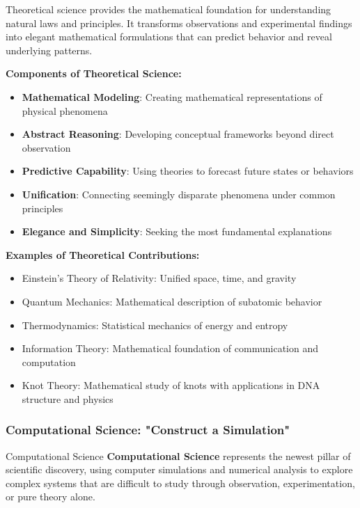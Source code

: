 Theoretical science provides the mathematical foundation for understanding natural laws and principles. It transforms observations and experimental findings into elegant mathematical formulations that can predict behavior and reveal underlying patterns.

\textbf{Components of Theoretical Science:}
\begin{itemize}
    \item \textbf{Mathematical Modeling}: Creating mathematical representations of physical phenomena
    \item \textbf{Abstract Reasoning}: Developing conceptual frameworks beyond direct observation
    \item \textbf{Predictive Capability}: Using theories to forecast future states or behaviors
    \item \textbf{Unification}: Connecting seemingly disparate phenomena under common principles
    \item \textbf{Elegance and Simplicity}: Seeking the most fundamental explanations
\end{itemize}

\textbf{Examples of Theoretical Contributions:}
\begin{itemize}
    \item Einstein's Theory of Relativity: Unified space, time, and gravity
    \item Quantum Mechanics: Mathematical description of subatomic behavior
    \item Thermodynamics: Statistical mechanics of energy and entropy
    \item Information Theory: Mathematical foundation of communication and computation
    \item Knot Theory: Mathematical study of knots with applications in DNA structure and physics
\end{itemize}

\subsubsection{Computational Science: "Construct a Simulation"}

\begin{conceptcard}{Computational Science}
\textbf{Computational Science} represents the newest pillar of scientific discovery, using computer simulations and numerical analysis to explore complex systems that are difficult to study through observation, experimentation, or pure theory alone.
\end{conceptcard}

